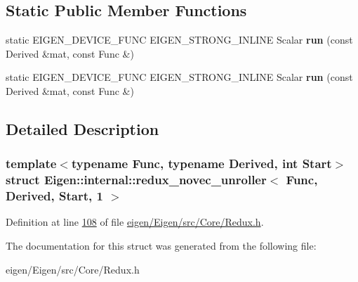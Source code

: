 \subsection*{Static Public Member Functions}
\begin{DoxyCompactItemize}
\item 
\mbox{\label{struct_eigen_1_1internal_1_1redux__novec__unroller_3_01_func_00_01_derived_00_01_start_00_011_01_4_a02b496586cb50a903ccdc3a7eb31518c}} 
static E\+I\+G\+E\+N\+\_\+\+D\+E\+V\+I\+C\+E\+\_\+\+F\+U\+NC E\+I\+G\+E\+N\+\_\+\+S\+T\+R\+O\+N\+G\+\_\+\+I\+N\+L\+I\+NE Scalar {\bfseries run} (const Derived \&mat, const Func \&)
\item 
\mbox{\label{struct_eigen_1_1internal_1_1redux__novec__unroller_3_01_func_00_01_derived_00_01_start_00_011_01_4_a02b496586cb50a903ccdc3a7eb31518c}} 
static E\+I\+G\+E\+N\+\_\+\+D\+E\+V\+I\+C\+E\+\_\+\+F\+U\+NC E\+I\+G\+E\+N\+\_\+\+S\+T\+R\+O\+N\+G\+\_\+\+I\+N\+L\+I\+NE Scalar {\bfseries run} (const Derived \&mat, const Func \&)
\end{DoxyCompactItemize}


\subsection{Detailed Description}
\subsubsection*{template$<$typename Func, typename Derived, int Start$>$\newline
struct Eigen\+::internal\+::redux\+\_\+novec\+\_\+unroller$<$ Func, Derived, Start, 1 $>$}



Definition at line \hyperlink{eigen_2_eigen_2src_2_core_2_redux_8h_source_l00108}{108} of file \hyperlink{eigen_2_eigen_2src_2_core_2_redux_8h_source}{eigen/\+Eigen/src/\+Core/\+Redux.\+h}.



The documentation for this struct was generated from the following file\+:\begin{DoxyCompactItemize}
\item 
eigen/\+Eigen/src/\+Core/\+Redux.\+h\end{DoxyCompactItemize}
